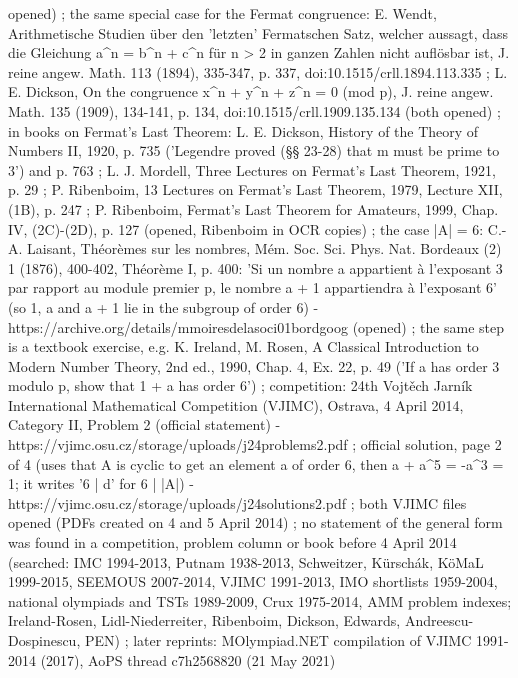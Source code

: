 opened) ; the same special case for the Fermat congruence: E. Wendt, Arithmetische Studien über den 'letzten' Fermatschen Satz, welcher aussagt, dass die Gleichung a^n = b^n + c^n für n > 2 in ganzen Zahlen nicht auflösbar ist, J. reine angew. Math. 113 (1894), 335-347, p. 337, doi:10.1515/crll.1894.113.335 ; L. E. Dickson, On the congruence x^n + y^n + z^n = 0 (mod p), J. reine angew. Math. 135 (1909), 134-141, p. 134, doi:10.1515/crll.1909.135.134 (both opened) ; in books on Fermat's Last Theorem: L. E. Dickson, History of the Theory of Numbers II, 1920, p. 735 ('Legendre proved (§§ 23-28) that m must be prime to 3') and p. 763 ; L. J. Mordell, Three Lectures on Fermat's Last Theorem, 1921, p. 29 ; P. Ribenboim, 13 Lectures on Fermat's Last Theorem, 1979, Lecture XII, (1B), p. 247 ; P. Ribenboim, Fermat's Last Theorem for Amateurs, 1999, Chap. IV, (2C)-(2D), p. 127 (opened, Ribenboim in OCR copies) ; the case |A| = 6: C.-A. Laisant, Théorèmes sur les nombres, Mém. Soc. Sci. Phys. Nat. Bordeaux (2) 1 (1876), 400-402, Théorème I, p. 400: 'Si un nombre a appartient à l'exposant 3 par rapport au module premier p, le nombre a + 1 appartiendra à l'exposant 6' (so 1, a and a + 1 lie in the subgroup of order 6) - https://archive.org/details/mmoiresdelasoci01bordgoog (opened) ; the same step is a textbook exercise, e.g. K. Ireland, M. Rosen, A Classical Introduction to Modern Number Theory, 2nd ed., 1990, Chap. 4, Ex. 22, p. 49 ('If a has order 3 modulo p, show that 1 + a has order 6') ; competition: 24th Vojtěch Jarník International Mathematical Competition (VJIMC), Ostrava, 4 April 2014, Category II, Problem 2 (official statement) - https://vjimc.osu.cz/storage/uploads/j24problems2.pdf ; official solution, page 2 of 4 (uses that A is cyclic to get an element a of order 6, then a + a^5 = -a^3 = 1; it writes '6 | d' for 6 | |A|) - https://vjimc.osu.cz/storage/uploads/j24solutions2.pdf ; both VJIMC files opened (PDFs created on 4 and 5 April 2014) ; no statement of the general form was found in a competition, problem column or book before 4 April 2014 (searched: IMC 1994-2013, Putnam 1938-2013, Schweitzer, Kürschák, KöMaL 1999-2015, SEEMOUS 2007-2014, VJIMC 1991-2013, IMO shortlists 1959-2004, national olympiads and TSTs 1989-2009, Crux 1975-2014, AMM problem indexes; Ireland-Rosen, Lidl-Niederreiter, Ribenboim, Dickson, Edwards, Andreescu-Dospinescu, PEN) ; later reprints: MOlympiad.NET compilation of VJIMC 1991-2014 (2017), AoPS thread c7h2568820 (21 May 2021)
%

